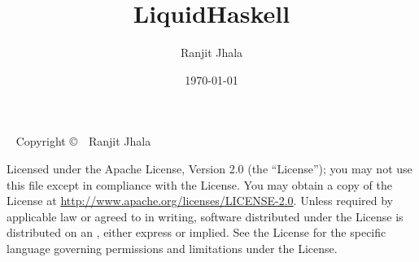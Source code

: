 \documentclass{tufte-book}
\title{LiquidHaskell}
\author{Ranjit Jhala}
\date{\today}
\begin{document}
\maketitle


\newpage

\begin{fullwidth}
~\vfill
\thispagestyle{empty}
\setlength{\parindent}{0pt}
\setlength{\parskip}{\baselineskip}
Copyright \copyright\ \the\year\ Ranjit Jhala

\par{}

\par Licensed under the Apache License, Version 2.0 (the ``License''); you may not
use this file except in compliance with the License. You may obtain a copy
of the License at \url{http://www.apache.org/licenses/LICENSE-2.0}. Unless
required by applicable law or agreed to in writing, software distributed
under the License is distributed on an , either express or implied. See the
License for the specific language governing permissions and limitations
under the License.


\end{fullwidth}

{
\setcounter{tocdepth}{5}
\tableofcontents
}

\listoftables

\listoffigures




\end{document}
